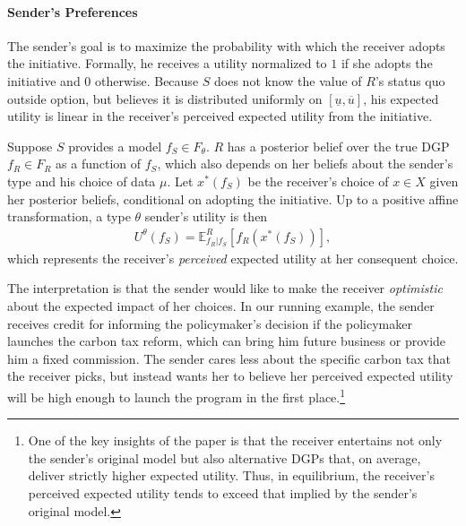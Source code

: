\documentclass[11pt,dvipsnames]{article}
\begin{document}
\paragraph{Sender's Preferences}
The sender's goal is to maximize the probability with which the receiver adopts the initiative.
Formally, he receives a utility normalized to $1$ if she adopts the initiative and $0$ otherwise.
Because $S$ does not know the value of $R$'s status quo outside option, but believes it is distributed uniformly on $[\underline{u},\overline{u}]$, his expected utility is linear in the receiver's perceived expected utility from the initiative.

Suppose $S$ provides a model $f_S \in F_\theta$.
$R$ has a posterior belief over the true DGP $f_R \in F_R$ as a function of $f_S$, which also depends on her beliefs about the sender's type and his choice of data $\mu$.
Let $x^*(f_S)$ be the receiver's choice of $x \in X$ given her posterior beliefs, conditional on adopting the initiative.
Up to a positive affine transformation, a type $\theta$ sender's utility is then
\begin{align*}
U^\theta(f_S) = \mathbb{E}_{f_R|f_S}^R[f_R(x^*(f_S))],
\end{align*}
which represents the receiver's \emph{perceived} expected utility at her consequent choice.

The interpretation is that the sender would like to make the receiver \emph{optimistic} about the expected impact of her choices.
In our running example, the sender receives credit for informing the policymaker's decision if the policymaker launches the carbon tax reform, which can bring him future business or provide him a fixed commission. 
The sender cares less about the specific carbon tax that the receiver picks, but instead wants her to believe her perceived expected utility will be high enough to launch the program in the first place.\footnote{One of the key insights of the paper is that the receiver entertains not only the sender's original model but also alternative DGPs that, on average, deliver strictly higher expected utility. Thus, in equilibrium, the receiver's perceived expected utility tends to exceed that implied by the sender's original model.}
\end{document}
